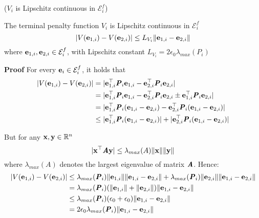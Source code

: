 \begin{bw_box}
\begin{lemma} ($V_i$ is Lipschitz continuous in $\mathcal{E}_i^f$)

  The terminal penalty function $V_i$ is Lipschitz continuous in
  $\mathcal{E}_i^f$
  $$|V(\bm{\mathbf{e}}_{1,i}) - V(\bm{\mathbf{e}}_{2,i})| \leq L_{V_i} \|\bm{\mathbf{e}}_{1,i} - \bm{\mathbf{e}}_{2,i}\|$$
  where $\bm{\mathbf{e}}_{1,i}, \bm{\mathbf{e}}_{2,i} \in \mathcal{E}_i^f$,
  with Lipschitz constant $L_{V_i} = 2 \epsilon_0 \lambda_{max}(P_i)$\\

  \begin{gg_box}
  \textbf{Proof} For every $\bm{\mathbf{e}}_i \in \mathcal{E}_i^f$, it holds that
  \begin{align}
    |V(\bm{\mathbf{e}}_{1,i}) - V(\bm{\mathbf{e}}_{2,i})| &= |\bm{\mathbf{e}}_{1,i}^{\top} \bm{\mathit{P}}_i \bm{\mathbf{e}}_{1,i} - \bm{\mathbf{e}}_{2,i}^{\top} \bm{\mathit{P}}_i \bm{\mathbf{e}}_{2,i}| \\
      &= |\bm{\mathbf{e}}_{1,i}^{\top} \bm{\mathit{P}}_i \bm{\mathbf{e}}_{1,i} - \bm{\mathbf{e}}_{2,i}^{\top} \bm{\mathit{P}}_i \bm{\mathbf{e}}_{2,i} \pm \bm{\mathbf{e}}_{1,i}^{\top} \bm{\mathit{P}}_i \bm{\mathbf{e}}_{2,i}| \\
      &= |\bm{\mathbf{e}}_{1,i}^{\top} \bm{\mathit{P}}_i (\bm{\mathbf{e}}_{1,i}-\bm{\mathbf{e}}_{2,i}) - \bm{\mathbf{e}}_{2,i}^{\top} \bm{\mathit{P}}_i (\bm{\mathbf{e}}_{1,i}-\bm{\mathbf{e}}_{2,i})| \\
      &\leq |\bm{\mathbf{e}}_{1,i}^{\top} \bm{\mathit{P}}_i (\bm{\mathbf{e}}_{1,i}-\bm{\mathbf{e}}_{2,i})| + |\bm{\mathbf{e}}_{2,i}^{\top} \bm{\mathit{P}}_i (\bm{\mathbf{e}}_{1,i}-\bm{\mathbf{e}}_{2,i})|
  \end{align}

  But for any $\bm{\mathbf{x}}, \bm{\mathbf{y}} \in \mathbb{R}^n$
  $$|\bm{\mathbf{x}}^{\top} \bm{\mathit{A}} \bm{\mathbf{y}}| \leq \lambda_{max}(A) \|\bm{\mathbf{x}}\| \|\bm{\mathbf{y}}\|$$
  where $\lambda_{max}(A)$ denotes the largest eigenvalue of matrix $\bm{\mathit{A}}$.
  Hence:
  \begin{align}
    |V(\bm{\mathbf{e}}_{1,i}) - V(\bm{\mathbf{e}}_{2,i})| &\leq
    \lambda_{max}(\bm{\mathit{P}}_i) \|\bm{\mathbf{e}}_{1,i}\| \|\bm{\mathbf{e}}_{1,i} - \bm{\mathbf{e}}_{2,i}\| +
    \lambda_{max}(\bm{\mathit{P}}_i) \|\bm{\mathbf{e}}_{2,i}\| \|\bm{\mathbf{e}}_{1,i} - \bm{\mathbf{e}}_{2,i}\| \\
    &= \lambda_{max}(\bm{\mathit{P}}_i) (\|\bm{\mathbf{e}}_{1,i}\| + \|\bm{\mathbf{e}}_{2,i}\|)\|\bm{\mathbf{e}}_{1,i} - \bm{\mathbf{e}}_{2,i}\| \\
    & \leq \lambda_{max}(\bm{\mathit{P}}_i) (\epsilon_0 + \epsilon_0)\|\bm{\mathbf{e}}_{1,i} - \bm{\mathbf{e}}_{2,i}\| \\
    &= 2 \epsilon_0 \lambda_{max}(\bm{\mathit{P}}_i) \|\bm{\mathbf{e}}_{1,i} - \bm{\mathbf{e}}_{2,i}\|
  \end{align}
  \qedsymbol
  \end{gg_box}
\label{lemma:V_Lipschitz_e_0}
\end{lemma}
\end{bw_box}


